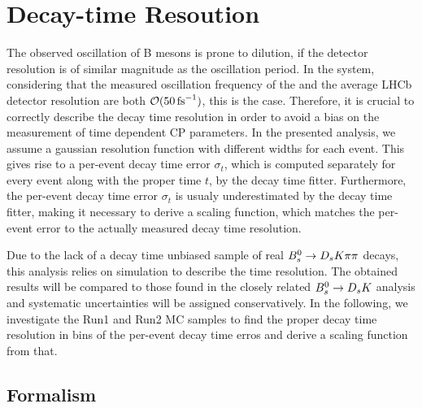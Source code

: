 
\section{Decay-time Resoution}
\label{sec:Resolution}

The observed oscillation of B mesons is prone to dilution, if the detector resolution is of similar magnitude as the oscillation period. 
In the \Bs system, considering that the measured oscillation frequency of the \Bs \cite{PDG2014} and the average LHCb detector resolution \cite{LHCb-DP-2014-002} are both $\mathcal{O}(50 \mathrm{ \,fs}^{-1})$, this is the case.
Therefore, it is crucial to correctly describe the decay time resolution in order to avoid a bias on the measurement of time dependent CP parameters. \newline
In the presented analysis, we assume a gaussian resolution function with different widths for each event. 
This gives rise to a per-event decay time error $\sigma_{t}$, which is computed separately for every event along with the proper time $t$, by the decay time fitter. 
Furthermore, the per-event decay time error $\sigma_{t}$ is usualy underestimated by the decay time fitter, 
making it necessary to derive a scaling function, which matches the per-event error to the actually measured decay time resolution. \newline

Due to the lack of a decay time unbiased sample of real ${{B}^0_{s}}\rightarrow{\ensuremath{{D}_{s}}}{\ensuremath{K}}{\ensuremath{\pi}}{\ensuremath{\pi}}$ decays, this analysis relies on simulation to describe the time resolution. 
The obtained results will be compared to those found in the closely related ${{B}^0_{s}}\rightarrow{\ensuremath{{D}_{s}}}{\ensuremath{K}}$ analysis and systematic uncertainties will be assigned conservatively.
In the following, we investigate the Run1 and Run2 MC samples to find the proper decay time resolution in bins of the per-event decay time erros and derive a scaling function from that.      

\subsection{Formalism} 

